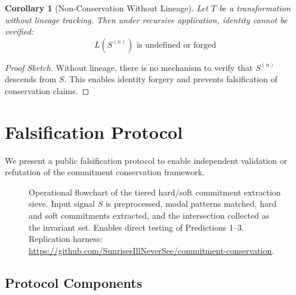\documentclass[11pt,a4paper]{article}
\newtheorem{corollary}[theorem]{Corollary}
\begin{document}
\begin{corollary}[Non-Conservation Without Lineage]
\label{cor:lineage}
Let $T$ be a transformation without lineage tracking. Then under recursive application, identity cannot be verified:
\begin{equation}
L(S^{(n)}) \text{ is undefined or forged}
\end{equation}
\end{corollary}

\begin{proof}[Proof Sketch]
Without lineage, there is no mechanism to verify that $S^{(n)}$ descends from $S$. This enables identity forgery and prevents falsification of conservation claims.
\end{proof}

\section{Falsification Protocol}
\label{sec:falsification}

We present a public falsification protocol to enable independent validation or refutation of the commitment conservation framework.

\begin{figure}
    \centering
    
    \caption{Operational flowchart of the tiered hard/soft commitment extraction sieve. Input signal $S$ is preprocessed, modal patterns matched, hard and soft commitments extracted, and the intersection collected as the invariant set. Enables direct testing of Predictions 1--3. Replication harness: \url{https://github.com/SunrisesIllNeverSee/commitment-conservation}.}
    \label{fig:extraction-flow}
\end{figure}

\subsection{Protocol Components}
\end{document}

